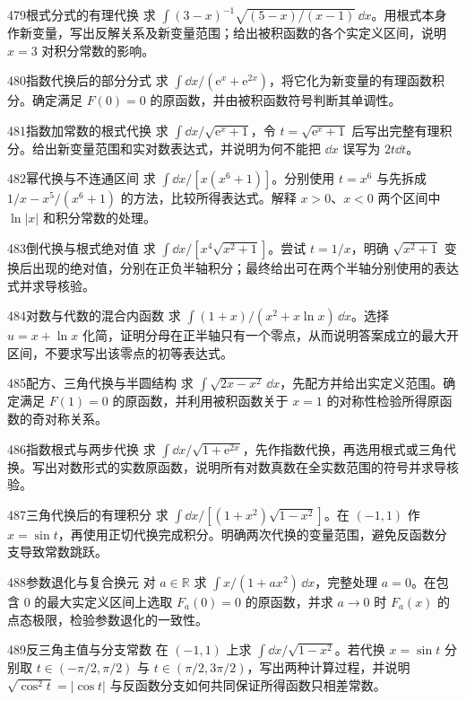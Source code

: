\begin{exercise}{479}{根式分式的有理代换}
求 $\int(3-x)^{-1}\sqrt{(5-x)/(x-1)}\,\dd x$。用根式本身作新变量，写出反解关系及新变量范围；给出被积函数的各个实定义区间，说明 $x=3$ 对积分常数的影响。
\end{exercise}
\begin{exercise}{480}{指数代换后的部分分式}
求 $\int\dd x/(\mathrm e^x+\mathrm e^{2x})$，将它化为新变量的有理函数积分。确定满足 $F(0)=0$ 的原函数，并由被积函数符号判断其单调性。
\end{exercise}
\begin{exercise}{481}{指数加常数的根式代换}
求 $\int\dd x/\sqrt{\mathrm e^x+1}$，令 $t=\sqrt{\mathrm e^x+1}$ 后写出完整有理积分。给出新变量范围和实对数表达式，并说明为何不能把 $\dd x$ 误写为 $2t\dd t$。
\end{exercise}
\begin{exercise}{482}{幂代换与不连通区间}
求 $\int\dd x/[x(x^6+1)]$。分别使用 $t=x^6$ 与先拆成 $1/x-x^5/(x^6+1)$ 的方法，比较所得表达式。解释 $x>0$、$x<0$ 两个区间中 $\ln|x|$ 和积分常数的处理。
\end{exercise}
\begin{exercise}{483}{倒代换与根式绝对值}
求 $\int\dd x/[x^4\sqrt{x^2+1}]$。尝试 $t=1/x$，明确 $\sqrt{x^2+1}$ 变换后出现的绝对值，分别在正负半轴积分；最终给出可在两个半轴分别使用的表达式并求导核验。
\end{exercise}
\begin{exercise}{484}{对数与代数的混合内函数}
求 $\int(1+x)/(x^2+x\ln x)\,\dd x$。选择 $u=x+\ln x$ 化简，证明分母在正半轴只有一个零点，从而说明答案成立的最大开区间，不要求写出该零点的初等表达式。
\end{exercise}
\begin{exercise}{485}{配方、三角代换与半圆结构}
求 $\int\sqrt{2x-x^2}\,\dd x$，先配方并给出实定义范围。确定满足 $F(1)=0$ 的原函数，并利用被积函数关于 $x=1$ 的对称性检验所得原函数的奇对称关系。
\end{exercise}
\begin{exercise}{486}{指数根式与两步代换}
求 $\int\dd x/\sqrt{1+\mathrm e^{2x}}$，先作指数代换，再选用根式或三角代换。写出对数形式的实数原函数，说明所有对数真数在全实数范围的符号并求导核验。
\end{exercise}
\begin{exercise}{487}{三角代换后的有理积分}
求 $\int\dd x/[(1+x^2)\sqrt{1-x^2}]$。在 $(-1,1)$ 作 $x=\sin t$，再使用正切代换完成积分。明确两次代换的变量范围，避免反函数分支导致常数跳跃。
\end{exercise}
\begin{exercise}{488}{参数退化与复合换元}
对 $a\in\mathbb R$ 求 $\int x/(1+ax^2)\,\dd x$，完整处理 $a=0$。在包含 $0$ 的最大实定义区间上选取 $F_a(0)=0$ 的原函数，并求 $a\to0$ 时 $F_a(x)$ 的点态极限，检验参数退化的一致性。
\end{exercise}
\begin{exercise}{489}{反三角主值与分支常数}
在 $(-1,1)$ 上求 $\int\dd x/\sqrt{1-x^2}$。若代换 $x=\sin t$ 分别取 $t\in(-\pi/2,\pi/2)$ 与 $t\in(\pi/2,3\pi/2)$，写出两种计算过程，并说明 $\sqrt{\cos^2t}=|\cos t|$ 与反函数分支如何共同保证所得函数只相差常数。
\end{exercise}
